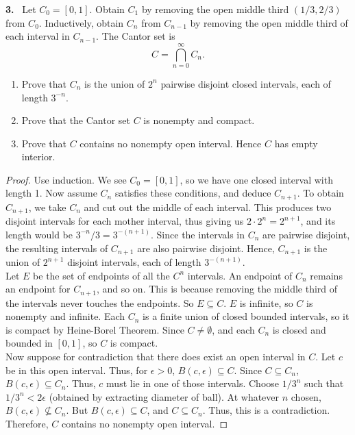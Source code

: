 \documentclass[12pt]{amsart}
\theoremstyle{plain}
\theoremstyle{definition}
\theoremstyle{remark}
\newenvironment{problem}[1]{\par\medskip\noindent\textbf{#1.}\ }{\par\smallskip}
\begin{document}
\begin{problem}{3}
Let $C_0 = [0,1]$. Obtain $C_1$ by removing the open middle third $(1/3,2/3)$ from $C_0$. Inductively, obtain $C_n$ from $C_{n-1}$ by removing the open middle third of each interval in $C_{n-1}.$ The Cantor set is 
\[
C = \bigcap_{n=0}^{\infty} C_n.
\]
\begin{enumerate}
  \item[(a)]   Prove that $C_n$ is the union of $2^n$ pairwise disjoint closed intervals, each of length $3^{-n}$.
  \item[(b)]   Prove that the Cantor set $C$ is nonempty and compact.
  \item[(c)]   Prove that $C$ contains no nonempty open interval. Hence $C$ has empty interior. 
\end{enumerate}

\end{problem}

\begin{proof}
    Use induction. We see $C_0 = [0,1]$, so we have one closed interval with length 1. Now assume $C_n$ satisfies these conditions, and deduce $C_{n+1}$. To obtain $C_{n+1}$, we take $C_n$ and cut out the middle of each interval. This produces two disjoint intervals for each mother interval, thus giving us $2 \cdot 2^n = 2^{n+1}$, and its length would be $3^{-n}/3 = 3^{-(n+1)}$. Since the intervals in $C_n$ are pairwise disjoint, the resulting intervals of $C_{n+1}$ are also pairwise disjoint. Hence, $C_{n+1}$ is the union of $2^{n+1}$ disjoint intervals, each of length $3^{-(n+1)}$. \\
    Let $E$ be the set of endpoints of all the $C^n$ intervals. An endpoint of $C_n$ remains an endpoint for $C_{n+1}$, and so on. This is because removing the middle third of the intervals never touches the endpoints. So $E \subseteq C$. $E$ is infinite, so $C$ is nonempty and infinite. Each $C_n$ is a finite union of closed bounded intervals, so it is compact by Heine-Borel Theorem. Since $C \neq \emptyset$, and each $C_n$ is closed and bounded in $[0,1]$, so $C$ is compact. \\
    Now suppose for contradiction that there does exist an open interval in $C$. Let $c$ be in this open interval. Thus, for $\epsilon > 0$, $B(c,\epsilon) \subseteq C$. Since $C \subseteq C_n$, $B(c,\epsilon) \subseteq C_n$. Thus, $c$ must lie in one of those intervals. Choose $1/3^n$ such that $1/3^n < 2\epsilon$ (obtained by extracting diameter of ball). At whatever $n$ chosen, $B(c,\epsilon) \not \subseteq C_n$. But $B(c,\epsilon) \subseteq C$, and $C \subseteq C_n$. Thus, this is a contradiction. Therefore, $C$ contains no nonempty open interval. 
\end{proof}
\end{document}
